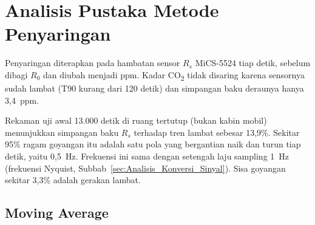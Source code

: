 \section{Analisis Pustaka Metode Penyaringan}
\label{sec:Analisis_Penyaringan}

    Penyaringan diterapkan pada hambatan sensor $R_s$ MiCS-5524 tiap detik, sebelum dibagi $R_0$ dan diubah menjadi ppm. Kadar CO\textsubscript{2} tidak disaring karena sensornya sudah lambat (T90 kurang dari 120 detik) dan simpangan baku deraunya hanya 3,4~ppm.

    Rekaman uji awal 13.000 detik di ruang tertutup (bukan kabin mobil) menunjukkan simpangan baku $R_s$ terhadap tren lambat sebesar 13,9\%. Sekitar 95\% ragam goyangan itu adalah satu pola yang bergantian naik dan turun tiap detik, yaitu 0,5~Hz. Frekuensi ini sama dengan setengah laju sampling 1~Hz (frekuensi Nyquist, Subbab~\ref{sec:Analisis_Konversi_Sinyal}). Sisa goyangan sekitar 3,3\% adalah gerakan lambat.

    \subsection{Moving Average}
    \label{sec:Penyaringan_MA}

